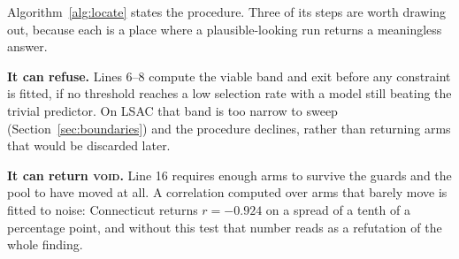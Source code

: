 \documentclass[conference]{IEEEtran}
\begin{document}
Algorithm~\ref{alg:locate} states the procedure. Three of its steps are worth drawing out,
because each is a place where a plausible-looking run returns a meaningless answer.

\textbf{It can refuse.} Lines 6--8 compute the viable band and exit before any constraint is
fitted, if no threshold reaches a low selection rate with a model still beating the trivial
predictor. On LSAC that band is too narrow to sweep (Section~\ref{sec:boundaries}) and the procedure
declines, rather than returning arms that would be discarded later.

\textbf{It can return \textsc{void}.} Line 16 requires enough arms to survive the guards
and the pool to have moved at all. A
correlation computed over arms that barely move is fitted to noise: Connecticut returns
$r=-0.924$ on a spread of a tenth of a percentage point, and without this test that number
reads as a refutation of the whole finding.
\end{document}
